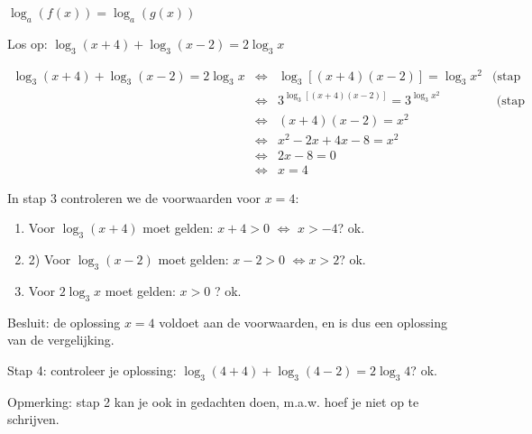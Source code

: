 \begin{voorbeeld} $\log_{a}\left(f(x)\right)=\log_{a}\left(g(x)\right)$ 

Los op: $ \log_{3}(x+4)+\log_{3}(x-2)=2\log_{3}x$

\begin{equation*} 
\begin{array}{rclr}
\log_{3}(x+4)+\log_{3}(x-2)=2\log_{3}x
	&\iff & \log_{3}\left[\left(x+4\right)\left(x-2\right)\right] = \log_{3}x^{2} & \text{(stap 1)}\\
	&\iff & 3^{\log_{3}\left[\left(x+4\right)\left(x-2\right)\right]} = 3^{\log_{3}x^{2}} & \text{ (stap 2)}\\
	&\iff & \left(x+4\right)\left(x-2\right) = x^{2} & \\
	&\iff & x^{2}-2x+4x-8 = x^{2} & \\
	&\iff & 2x-8 = 0& \\
	&\iff & x = 4 & 
\end{array}
\end{equation*}


In stap 3 controleren we de voorwaarden voor $x=4$:

\begin{enumerate}
	\item Voor $ \log_{3}(x+4)$ moet gelden: $x+4>0$ $\iff$
$x>-4$? ok.
	\item 2) Voor $ \log_{3}(x-2)$ moet gelden: $x-2>0$ $\iff x>2$? ok.
	\item Voor $ 2\log_{3}x$ moet gelden: $x>0$ ? ok.
\end{enumerate}

Besluit: de oplossing $x=4$ voldoet aan de voorwaarden, en is dus
een oplossing van de vergelijking.

Stap 4: controleer je oplossing: $\log_{3}(4+4)+\log_{3}(4-2)=2\log_{3}4$? ok.

Opmerking: stap 2 kan je ook in gedachten doen, m.a.w. hoef je niet
op te schrijven.
\end{voorbeeld}

